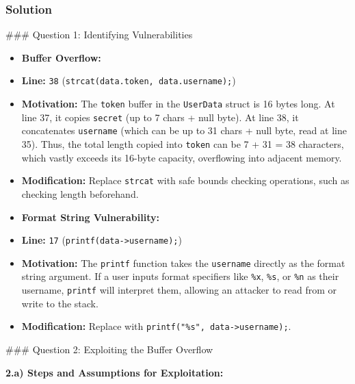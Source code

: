 \documentclass{article}
\begin{document}
\subsubsection*{Solution}
\#\#\# Question 1: Identifying Vulnerabilities

\begin{itemize}
    \item[\textbf{1.}] \textbf{Buffer Overflow:}
    \item \textbf{Line:} \texttt{38} (\texttt{strcat(data.token, data.username);})
    \item \textbf{Motivation:} The \texttt{token} buffer in the \texttt{UserData} struct is 16 bytes long. At line 37, it copies \texttt{secret} (up to 7 chars + null byte). At line 38, it concatenates \texttt{username} (which can be up to 31 chars + null byte, read at line 35). Thus, the total length copied into \texttt{token} can be 7 + 31 = 38 characters, which vastly exceeds its 16-byte capacity, overflowing into adjacent memory.
    \item \textbf{Modification:} Replace \texttt{strcat} with safe bounds checking operations, such as checking length beforehand.

    \item[\textbf{2.}] \textbf{Format String Vulnerability:}
    \item \textbf{Line:} \texttt{17} (\texttt{printf(data->username);})
    \item \textbf{Motivation:} The \texttt{printf} function takes the \texttt{username} directly as the format string argument. If a user inputs format specifiers like \texttt{\%x}, \texttt{\%s}, or \texttt{\%n} as their username, \texttt{printf} will interpret them, allowing an attacker to read from or write to the stack.
    \item \textbf{Modification:} Replace with \texttt{printf("\%s", data->username);}.

\end{itemize}
\#\#\# Question 2: Exploiting the Buffer Overflow

\textbf{2.a) Steps and Assumptions for Exploitation:}
\end{document}
